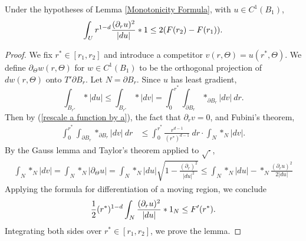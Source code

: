 \begin{lemma}\label{monotonicity lemma}
Under the hypotheses of Lemma \ref{Monotonicity Formula}, with $u \in C^1(B_1)$,
$$\int_U r^{1 - d}\frac{(\partial_ru)^2}{|du|} *1 \leq 2(F(r_2) - F(r_1)).$$
\end{lemma}
\begin{proof}
We fix $r^* \in [r_1, r_2]$ and introduce a competitor $v(r, \Theta) = u(r^*, \Theta)$. We define $\partial_\Theta w(r, \Theta)$ for $w \in C^1(B_1)$ to be the orthogonal projection of $dw(r, \Theta)$ onto $T'\partial B_r$.
Let $N = \partial B_r$.
Since $u$ has least gradient,
$$\int_{B_{r^*}} *|du| \leq \int_{B_{r^*}} *|dv| = \int_0^{r^*} \int_{\partial B_r} *_{\partial B_r} |dv| ~dr.$$
Then by (\ref{rescale a function by a}), the fact that $\partial_r v = 0$, and Fubini's theorem,
\begin{align*}
    \int_0^{r^*} \int_{\partial B_r} *_{\partial B_r} |dv| ~dr &\leq \int_0^{r^*} \frac{r^{d - 1}}{(r^*)^{d - 1}} ~dr \cdot \int_N *_N |dv|.
\end{align*}
By the Gauss lemma and Taylor's theorem applied to $\sqrt\cdot$,
\begin{align*}
\int_N *_N |dv| = \int_N *_N |\partial_\Theta u| = \int_N *_N |du|\sqrt{1 - \frac{(\partial_r)^2}{|du|^2}} \leq \int_N *_N|du| - *_N\frac{(\partial_ru)^2}{2|du|}
\end{align*}
Applying the formula for differentiation of a moving region, we conclude
$$\frac{1}{2} (r^*)^{1 - d} \int_N \frac{(\partial_ru)^2}{|du|} *1_N \leq F'(r^*).$$
Integrating both sides over $r^* \in [r_1, r_2]$, we prove the lemma.
\end{proof}

